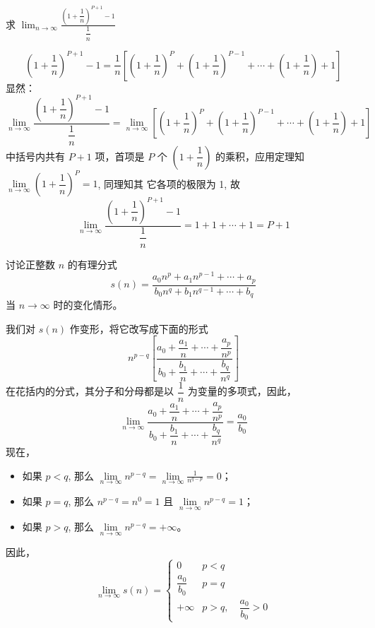 \begin{example}
求 $\displaystyle\lim_{n\to\infty}\frac{\left(1+\dfrac{1}{n}\right)^{P+1}-1}{\dfrac{1}{n}}$  
\end{example}

\begin{solution}
\[\left(1+\frac{1}{n}\right)^{P+1}-1=\frac{1}{n}\left[\left(1+\frac{1}{n}\right)^{P}+\left(1+\frac{1}{n}\right)^{P-1}+\cdots+\left(1+\frac{1}{n}\right)+1\right]\]
    显然：
\[ \lim_{n\to\infty}\frac{\left(1+\dfrac{1}{n}\right)^{P+1}-1}{\dfrac{1}{n}}=\lim_{n\to\infty}\left[\left(1+\frac{1}{n}\right)^{P}+\left(1+\frac{1}{n}\right)^{P-1}+\cdots+\left(1+\frac{1}{n}\right)+1\right]
\]
中括号内共有 $P+1$ 项，首项是 $P$ 个 $\left(1+\dfrac{1}{n}\right)$ 的乘积，应用定理知 $\lim\limits_{n\to\infty} \left(1+\dfrac{1}{n}\right)^{P}=1$, 同理知其
它各项的极限为 1, 故
\[    \lim_{n\to\infty}\frac{\left(1+\dfrac{1}{n}\right)^{P+1}-1}{\dfrac{1}{n}}=1+1+\cdots+1=P+1
\]
\end{solution}


\begin{example}
    讨论正整数 $n$ 的有理分式
\[s(n)=\frac{a_0n^p+a_1n^{p-1}+\cdots+a_p}{b_0n^q+b_1n^{q-1}+\cdots+b_q}\]
当 $n\to\infty$ 时的变化情形。
\end{example}

\begin{solution}
    我们对 $s(n)$ 作变形，将它改写成下面的形式
\[n^{p-q}\left[\frac{a_0+\dfrac{a_1}{n}+\cdots+\dfrac{a_p}{n^p}}{b_0+\dfrac{b_1}{n}+\cdots+\dfrac{b_q}{n^q}}\right]\]
在花括内的分式，其分子和分母都是以 $\dfrac{1}{n}$ 为变量的多项式，因此，
\[ \lim_{n\to\infty}\frac{a_0+\dfrac{a_1}{n}+\cdots+\dfrac{a_p}{n^p}}{b_0+\dfrac{b_1}{n}+\cdots+\dfrac{b_q}{n^q}}=\frac{a_0}{b_0}\]
现在，
\begin{itemize}[itemsep=5pt]
    \item 如果 $p<q$, 那么 $\lim\limits_{n\to\infty}n^{p-q}=\lim\limits_{n\to\infty}\frac{1}{n^{q-p}}=0$；
    \item 如果 $p=q$, 那么 $n^{p-q}=n^0=1$ 且 $\lim\limits_{n\to\infty}n^{p-q}=1$；
    \item 如果 $p>q$, 那么 $\lim\limits_{n\to\infty}n^{p-q}=+\infty$。
\end{itemize}
因此，
\[ \lim_{n\to\infty} s(n)=\begin{cases}
   0& p<q\\
\dfrac{a_0}{b_0} & p=q\\
+\infty & p>q,\quad \dfrac{a_0}{b_0}>0
\end{cases}\]
\end{solution}

